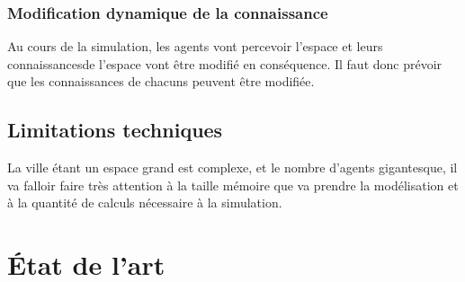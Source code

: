 \documentclass[a4paper]{article}
\begin{document}
\subsubsection{Modification dynamique de la connaissance}

Au cours de la simulation, les agents vont percevoir l'espace et leurs
connaissancesde l'espace vont être modifié en conséquence. Il faut donc prévoir
que les connaissances de chacuns peuvent être modifiée.

\subsection{Limitations techniques}

La ville étant un espace grand est complexe, et le nombre d'agents gigantesque,
il va falloir faire très attention à la taille mémoire que va prendre la
modélisation et à la quantité de calculs nécessaire à la simulation.

\section{État de l'art}
\end{document}
